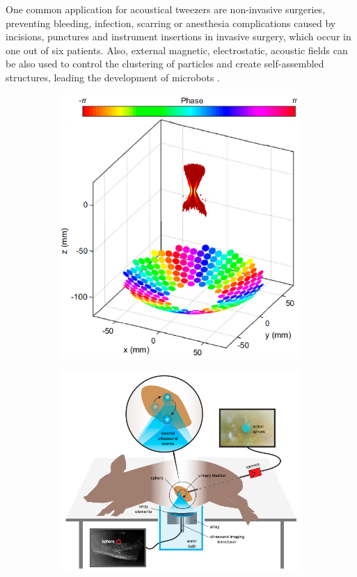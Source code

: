 One common application for acoustical tweezers are non-invasive surgeries, preventing bleeding, infection, scarring or anesthesia complications caused by incisions, punctures and instrument insertions in invasive surgery, which occur in one out of six patients. Also, external magnetic, electrostatic, acoustic fields can be also used to control the clustering of particles and create self-assembled structures, leading the development of microbots \cite{Ghanem2020, Kaiser2017}. 
\begin{figure}[t]
    \begin{subfigure}{.38\columnwidth}
    \centering
    \includegraphics[width=\textwidth]{images/intro/surgery_acTweezer.PNG}
    \caption{}
    \label{fig:ac_tw_surgery}
    \end{subfigure}
    \begin{subfigure}{.58\columnwidth}
    \centering
    \includegraphics[width=\textwidth]{images/intro/surgery.PNG}

\end{subfigure}
\end{figure}
